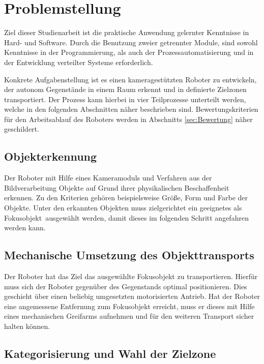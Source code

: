 \chapter{Problemstellung}
\label{cha:Problemstellung}

Ziel dieser Studienarbeit ist die praktische Anwendung gelernter Kenntnisse in Hard- und Software. Durch die Benutzung zweier getrennter Module, sind sowohl Kenntnisse in der Programmierung, als auch der Prozessautomatisierung und in der Entwicklung verteilter Systeme erforderlich.

Konkrete Aufgabenstellung ist es einen kameragestützten Roboter zu entwickeln, der autonom Gegenstände in einem Raum erkennt und in definierte Zielzonen transportiert. Der Prozess kann hierbei in vier Teilprozesse unterteilt werden, welche in den folgenden Abschnitten näher beschrieben sind. Bewertungskriterien für den Arbeitsablauf des Roboters werden in Abschnitts \ref{sec:Bewertung} näher geschildert.

\section{Objekterkennung} 
\label{sec:Erkennung}
Der Roboter mit Hilfe eines Kameramoduls und Verfahren aus der Bildverarbeitung Objekte auf Grund ihrer physikalischen Beschaffenheit erkennen. Zu den Kriterien gehören beispielsweise Größe, Form und Farbe der Objekte. Unter den erkannten Objekten muss zielgerichtet ein geeignetes als \glqq Fokusobjekt\grqq\ ausgewählt werden, damit dieses im folgenden Schritt angefahren werden kann.

\section{Mechanische Umsetzung des Objekttransports}
\label{sec:Transport}

Der Roboter hat das Ziel das ausgewählte Fokusobjekt zu transportieren. Hierfür muss sich der Roboter gegenüber des Gegenstands optimal positionieren. Dies geschieht über einen beliebig umgesetzten motorisierten Antrieb. Hat der Roboter eine angemessene Entfernung zum Fokusobjekt erreicht, muss er  dieses mit Hilfe eines mechanischen Greifarms aufnehmen und für den weiteren Transport sicher halten können.

\section{Kategorisierung und Wahl der Zielzone}


